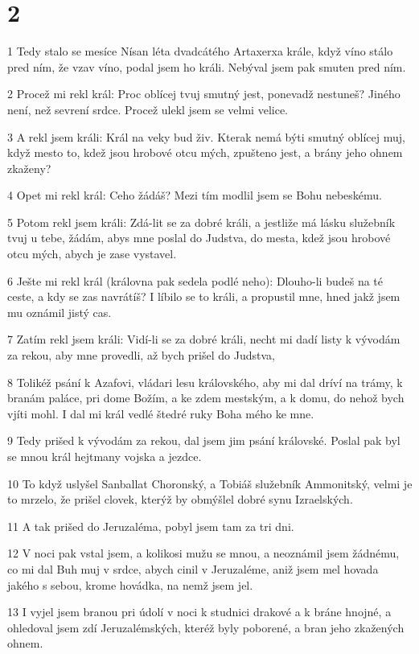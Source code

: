 \chapter{2}

\par 1 Tedy stalo se mesíce Nísan léta dvadcátého Artaxerxa krále, když víno stálo pred ním, že vzav víno, podal jsem ho králi. Nebýval jsem pak smuten pred ním.
\par 2 Procež mi rekl král: Proc oblícej tvuj smutný jest, ponevadž nestuneš? Jiného není, než sevrení srdce. Procež ulekl jsem se velmi velice.
\par 3 A rekl jsem králi: Král na veky bud živ. Kterak nemá býti smutný oblícej muj, když mesto to, kdež jsou hrobové otcu mých, zpušteno jest, a brány jeho ohnem zkaženy?
\par 4 Opet mi rekl král: Ceho žádáš? Mezi tím modlil jsem se Bohu nebeskému.
\par 5 Potom rekl jsem králi: Zdá-lit se za dobré králi, a jestliže má lásku služebník tvuj u tebe, žádám, abys mne poslal do Judstva, do mesta, kdež jsou hrobové otcu mých, abych je zase vystavel.
\par 6 Ješte mi rekl král (královna pak sedela podlé neho): Dlouho-li budeš na té ceste, a kdy se zas navrátíš? I líbilo se to králi, a propustil mne, hned jakž jsem mu oznámil jistý cas.
\par 7 Zatím rekl jsem králi: Vidí-li se za dobré králi, necht mi dadí listy k vývodám za rekou, aby mne provedli, až bych prišel do Judstva,
\par 8 Tolikéž psání k Azafovi, vládari lesu královského, aby mi dal dríví na trámy, k branám paláce, pri dome Božím, a ke zdem mestským, a k domu, do nehož bych vjíti mohl. I dal mi král vedlé štedré ruky Boha mého ke mne.
\par 9 Tedy prišed k vývodám za rekou, dal jsem jim psání královské. Poslal pak byl se mnou král hejtmany vojska a jezdce.
\par 10 To když uslyšel Sanballat Choronský, a Tobiáš služebník Ammonitský, velmi je to mrzelo, že prišel clovek, kterýž by obmýšlel dobré synu Izraelských.
\par 11 A tak prišed do Jeruzaléma, pobyl jsem tam za tri dni.
\par 12 V noci pak vstal jsem, a kolikosi mužu se mnou, a neoznámil jsem žádnému, co mi dal Buh muj v srdce, abych cinil v Jeruzaléme, aniž jsem mel hovada jakého s sebou, krome hovádka, na nemž jsem jel.
\par 13 I vyjel jsem branou pri údolí v noci k studnici drakové a k bráne hnojné, a ohledoval jsem zdí Jeruzalémských, kteréž byly poborené, a bran jeho zkažených ohnem.

